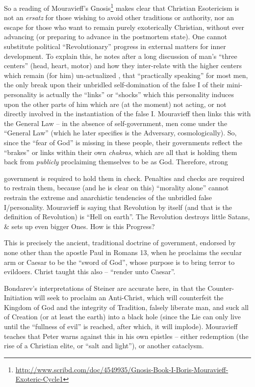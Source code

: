 So a reading of Mouravieff's Gnosis\footnote{\url{http://www.scribd.com/doc/4549935/Gnosis-Book-I-Boris-Mouravieff-Exoteric-Cycle1}} makes clear that Christian Esotericism is not an \emph{ersatz} for those wishing to avoid other traditions or authority, nor an escape for those who want to remain purely exoterically Christian, without ever advancing (or preparing to advance in the postmortem state). One cannot substitute political ``Revolutionary'' progress in external matters for inner development. To explain this, he notes after a long discussion of man's ``three centers'' (head, heart, motor) and how they inter-relate with the higher centers which remain (for him) un-actualized , that ``practically speaking'' for most men, the only break upon their unbridled self-domination of the false I of their mini-personality is actually the ``links'' or ``shocks'' which this personality induces upon the other parts of him which are (at the moment) not acting, or not directly involved in the instantiation of the false I. Mouravieff then links this with the General Law -- in the absence of self-government, men come under the ``General Law'' (which he later specifies is the Adversary, cosmologically). So, since the ``fear of God'' is missing in these people, their governments reflect the ``brakes'' or links within their own \emph{chakras}, which are all that is holding them back from
\emph{publicly} proclaiming themselves to be as God. Therefore, strong

government is required to hold them in check. Penalties and checks are required to restrain them, because (and he is clear on this) ``morality alone'' cannot restrain the extreme and anarchistic tendencies of the unbridled false I/personality. Mouravieff is saying that Revolution by itself (and that is the definition of Revolution) is ``Hell on earth''. The Revolution destroys little Satans, \& sets up even bigger Ones. How is this Progress?

This is precisely the ancient, traditional doctrine of government, endorsed by none other than the apostle Paul in Romans 13, when he proclaims the secular arm or Caesar to be the ``sword of God'', whose purpose is to bring terror to evildoers. Christ taught this also -- ``render unto Caesar''.

Bondarev's interpretations of Steiner are accurate here, in that the Counter-Initiation will seek to proclaim an Anti-Christ, which will counterfeit the Kingdom of God and the integrity of Tradition, falsely liberate man, and suck all of Creation (or at least the earth) into a black hole (since the Lie can only live until the ``fullness of evil'' is reached, after which, it will implode). Mouravieff teaches that Peter warns against this in his own epistles -- either redemption (the rise of a Christian elite, or ``salt and light''), or another cataclysm.

